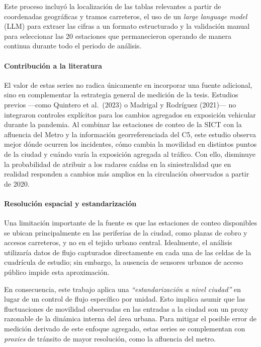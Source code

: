 Este proceso incluyó la localización de las tablas relevantes a partir de coordenadas geográficas y tramos carreteros, el uso de un \textit{large language model} (LLM) para extraer las cifras a un formato estructurado y la validación manual para seleccionar las 20 estaciones que permanecieron operando de manera continua durante todo el periodo de análisis.

\paragraph{Contribución a la literatura}

El valor de estas series no radica únicamente en incorporar una fuente adicional, sino en complementar la estrategia general de medición de la tesis. Estudios previos —como Quintero et al.\ (2023) o Madrigal y Rodríguez (2021)— no integraron controles explícitos para los cambios agregados en exposición vehicular durante la pandemia. Al combinar las estaciones de conteo de la SICT con la afluencia del Metro y la información georreferenciada del C5, este estudio observa mejor dónde ocurren los incidentes, cómo cambia la movilidad en distintos puntos de la ciudad y cuándo varía la exposición agregada al tráfico. Con ello, disminuye la probabilidad de atribuir a los radares caídas en la siniestralidad que en realidad responden a cambios más amplios en la circulación observados a partir de 2020.

\paragraph{Resolución espacial y estandarización}

Una limitación importante de la fuente es que las estaciones de conteo disponibles se ubican principalmente en las periferias de la ciudad, como plazas de cobro y accesos carreteros, y no en el tejido urbano central. Idealmente, el análisis utilizaría datos de flujo capturados directamente en cada una de las celdas de la cuadrícula de estudio; sin embargo, la ausencia de sensores urbanos de acceso público impide esta aproximación.

En consecuencia, este trabajo aplica una \textit{``estandarización a nivel ciudad''} en lugar de un control de flujo específico por unidad. Esto implica asumir que las fluctuaciones de movilidad observadas en las entradas a la ciudad son un proxy razonable de la dinámica interna del área urbana. Para mitigar el posible error de medición derivado de este enfoque agregado, estas series se complementan con \textit{proxies} de tránsito de mayor resolución, como la afluencia del metro.

